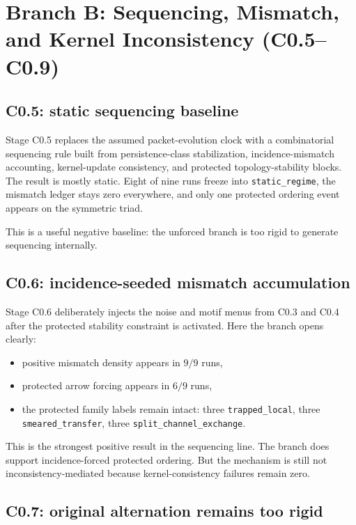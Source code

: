 \documentclass[11pt]{article}
\begin{document}
\section{Branch B: Sequencing, Mismatch, and Kernel Inconsistency (C0.5--C0.9)}

\subsection{C0.5: static sequencing baseline}

Stage C0.5 replaces the assumed packet-evolution clock with a combinatorial sequencing rule built from persistence-class stabilization, incidence-mismatch accounting, kernel-update consistency, and protected topology-stability blocks. The result is mostly static. Eight of nine runs freeze into \texttt{static\_regime}, the mismatch ledger stays zero everywhere, and only one protected ordering event appears on the symmetric triad.

This is a useful negative baseline: the unforced branch is too rigid to generate sequencing internally.

\subsection{C0.6: incidence-seeded mismatch accumulation}

Stage C0.6 deliberately injects the noise and motif menus from C0.3 and C0.4 after the protected stability constraint is activated. Here the branch opens clearly:
\begin{itemize}
\item positive mismatch density appears in $9/9$ runs,
\item protected arrow forcing appears in $6/9$ runs,
\item the protected family labels remain intact: three \texttt{trapped\_local}, three \texttt{smeared\_transfer}, three \texttt{split\_channel\_exchange}.
\end{itemize}

This is the strongest positive result in the sequencing line. The branch does support incidence-forced protected ordering. But the mechanism is still not inconsistency-mediated because kernel-consistency failures remain zero.

\subsection{C0.7: original alternation remains too rigid}
\end{document}
